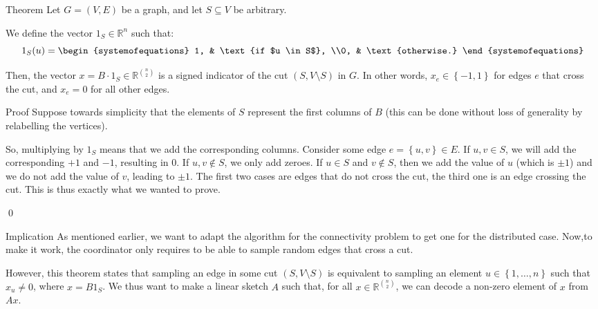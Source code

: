 \documentclass[a4paper]{article}
\begin{document}
\begin{parag}{Theorem}
    Let $G = \left(V, E\right)$ be a graph, and let $S \subseteq  V$ be arbitrary.

    We define the vector $1_S \in \mathbb{R}^n$ such that:
    \[1_S\left(u\right) = \begin{systemofequations} 1, & \text{if $u \in S$}, \\0, & \text{otherwise.} \end{systemofequations}\]
    
    Then, the vector $x = B \cdot 1_S \in \mathbb{R}^{\binom{n}{2}}$ is a signed indicator of the cut $\left(S, V \setminus S\right)$ in $G$. In other words, $x_e \in \left\{-1, 1\right\}$ for edges $e$ that cross the cut, and $x_e = 0$ for all other edges.

    \begin{subparag}{Proof}
        Suppose towards simplicity that the elements of $S$ represent the first columns of $B$ (this can be done without loss of generality by relabelling the vertices).

        So, multiplying by $1_S$ means that we add the corresponding columns. Consider some edge $e = \left\{u, v\right\} \in E$. If $u, v \in S$, we will add the corresponding $+1$ and $-1$, resulting in $0$. If $u, v \not\in S$, we only add zeroes. If $u \in S$ and $v \not \in S$, then we add the value of $u$ (which is $\pm 1$) and we do not add the value of $v$, leading to $\pm 1$. The first two cases are edges that do not cross the cut, the third one is an edge crossing the cut. This is thus exactly what we wanted to prove.

        \qed
    \end{subparag}

    \begin{subparag}{Implication}
        As mentioned earlier, we want to adapt the algorithm for the connectivity problem to get one for the distributed case. Now,to make it work, the coordinator only requires to be able to sample random edges that cross a cut. 

        However, this theorem states that sampling an edge in some cut $\left(S, V \setminus S\right)$ is equivalent to sampling an element $u \in \left\{1, \ldots, n\right\}$ such that $x_u \neq 0$, where $x = B 1_S$. We thus want to make a linear sketch $A$ such that, for all $x \in \mathbb{R}^{\binom{n}{2}}$, we can decode a non-zero element of $x$ from $A x$.
    \end{subparag}
\end{parag}
\end{document}
